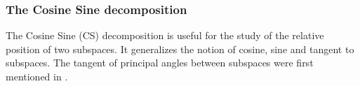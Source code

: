 \documentclass[twoside,11pt]{book}
\begin{document}
%    

\subsubsection{The Cosine Sine decomposition}
The Cosine Sine (CS) decomposition is useful for the study of the relative position of two subspaces. It generalizes the notion of cosine, sine and tangent to subspaces. The tangent of principal angles between subspaces were first mentioned in \citealp{ZhKn13}.
\end{document}
